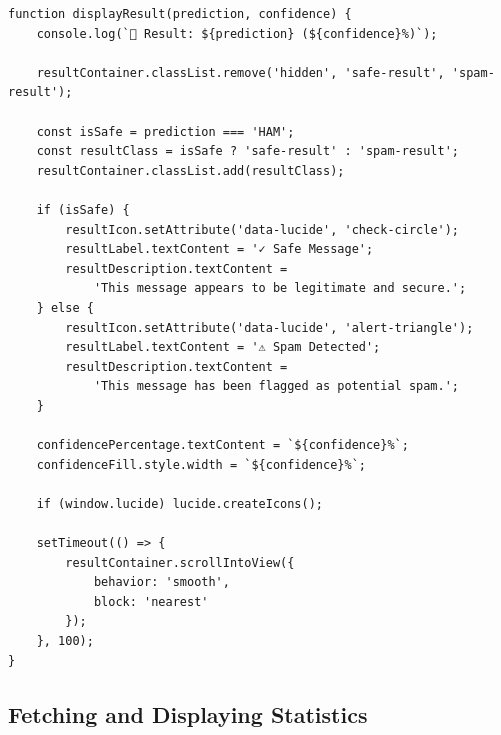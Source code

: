 \documentclass[12pt, a4paper]{article}
\begin{document}
\begin{verbatim}
function displayResult(prediction, confidence) {
    console.log(`🎯 Result: ${prediction} (${confidence}%)`);
    
    resultContainer.classList.remove('hidden', 'safe-result', 'spam-result');
    
    const isSafe = prediction === 'HAM';
    const resultClass = isSafe ? 'safe-result' : 'spam-result';
    resultContainer.classList.add(resultClass);
    
    if (isSafe) {
        resultIcon.setAttribute('data-lucide', 'check-circle');
        resultLabel.textContent = '✓ Safe Message';
        resultDescription.textContent = 
            'This message appears to be legitimate and secure.';
    } else {
        resultIcon.setAttribute('data-lucide', 'alert-triangle');
        resultLabel.textContent = '⚠️ Spam Detected';
        resultDescription.textContent = 
            'This message has been flagged as potential spam.';
    }
    
    confidencePercentage.textContent = `${confidence}%`;
    confidenceFill.style.width = `${confidence}%`;
    
    if (window.lucide) lucide.createIcons();
    
    setTimeout(() => {
        resultContainer.scrollIntoView({ 
            behavior: 'smooth', 
            block: 'nearest' 
        });
    }, 100);
}
\end{verbatim}

\subsection{Fetching and Displaying Statistics}
\end{document}
